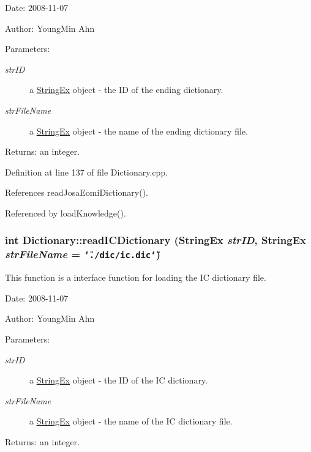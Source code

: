 \begin{Desc}
\item[Date:]2008-11-07 \end{Desc}
\begin{Desc}
\item[Author:]YoungMin Ahn \end{Desc}
\begin{Desc}
\item[Parameters:]
\begin{description}
\item[{\em strID}]a \hyperlink{classStringEx}{StringEx} object - the ID of the ending dictionary. \item[{\em strFileName}]a \hyperlink{classStringEx}{StringEx} object - the name of the ending dictionary file. \end{description}
\end{Desc}
\begin{Desc}
\item[Returns:]an integer. \end{Desc}


Definition at line 137 of file Dictionary.cpp.

References readJosaEomiDictionary().

Referenced by loadKnowledge().\hypertarget{classkmaOrange_1_1Dictionary_46494e1b96c54b9151c6b3facd270e48}{
\subsubsection[{readICDictionary}]{\setlength{\rightskip}{0pt plus 5cm}int Dictionary::readICDictionary ({\bf StringEx} {\em strID}, \/  {\bf StringEx} {\em strFileName} = {\tt \char`\"{}./dic/ic.dic\char`\"{}})}}
\label{classkmaOrange_1_1Dictionary_46494e1b96c54b9151c6b3facd270e48}


This function is a interface function for loading the IC dictionary file. 

\begin{Desc}
\item[Date:]2008-11-07 \end{Desc}
\begin{Desc}
\item[Author:]YoungMin Ahn \end{Desc}
\begin{Desc}
\item[Parameters:]
\begin{description}
\item[{\em strID}]a \hyperlink{classStringEx}{StringEx} object - the ID of the IC dictionary. \item[{\em strFileName}]a \hyperlink{classStringEx}{StringEx} object - the name of the IC dictionary file. \end{description}
\end{Desc}
\begin{Desc}
\item[Returns:]an integer. \end{Desc}



